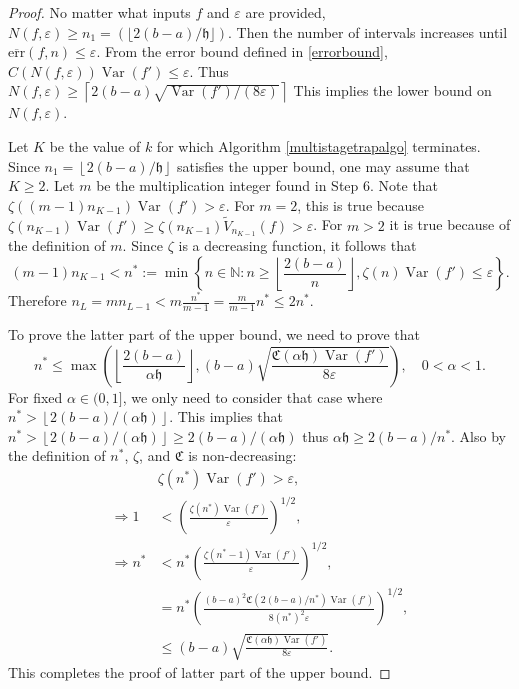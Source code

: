 \documentclass{iitthesis}
\DeclareMathOperator{\Var}{Var}
\theoremstyle{definition}
\theoremstyle{remark}
\begin{document}
\begin{proof}
  No matter what inputs $f$ and $\varepsilon$ are provided, $N(f,\varepsilon)\ge n_1=(\lfloor 2(b-a)/\mathfrak{h}\rfloor)$. Then the number of intervals increases until $\overline{\text{err}}(f,n)\le\varepsilon$. From the error bound defined in \eqref{errorbound}, $C(N(f,\varepsilon))\Var(f')\leq \varepsilon$. Thus $N(f,\varepsilon)\geq \left\lceil2(b-a)\sqrt{\Var(f')/(8\varepsilon)}\right\rceil$ This implies the lower bound on $N(f,\varepsilon)$.

  Let $K$ be the value of $k$ for which Algorithm \ref{multistagetrapalgo} terminates. Since $n_1=\left\lfloor2(b-a)/\mathfrak{h}\right\rfloor$ satisfies the upper bound, one may assume that $K \ge 2$. Let $m$ be the multiplication integer found in Step 6. Note that $\zeta((m-1)n_{K-1})\Var(f')>\varepsilon$. For $m=2$, this is true because $\zeta(n_{K-1})\Var(f')\ge\zeta(n_{K-1})\widetilde{V}_{n_{K-1}}(f)>\varepsilon$. For $m>2$ it is true because of the definition of $m$. Since $\zeta$ is a decreasing function, it follows that
  $$(m-1)n_{K-1}<n^*:=\min\left\{n\in\mathbb{N}:n\ge\left\lfloor\frac{2(b-a)}{n}\right\rfloor,\zeta(n)\Var(f')\le\varepsilon\right\}.$$
  Therefore $n_L=mn_{L-1}<m\frac{n^*}{m-1}=\frac{m}{m-1}n^*\le2n^*$.

  To prove the latter part of the upper bound, we need to prove that
  $$n^*\leq\max\left(\left\lfloor\frac{2(b-a)}{\alpha\mathfrak{h}}\right\rfloor,(b-a)\sqrt{\frac{\mathfrak{C}(\alpha\mathfrak{h})\Var(f')}{8\varepsilon}}\right),\quad 0<\alpha<1.$$
  For fixed $\alpha\in(0,1]$, we only need to consider that case where $n^*>\left\lfloor2(b-a)/(\alpha\mathfrak{h})\right\rfloor$. This implies that $n^*>\left\lfloor2(b-a)/(\alpha\mathfrak{h})\right\rfloor\ge 2(b-a)/(\alpha\mathfrak{h})$ thus $\alpha\mathfrak{h}\ge2(b-a)/n^*$. Also by the definition of $n^*$, $\zeta$, and $\mathfrak{C}$ is non-decreasing:
  \begin{align*}
    &\zeta(n^*)\Var(f')>\varepsilon, \\
    \Rightarrow 1&<\left(\frac{\zeta(n^*)\Var(f')}{\varepsilon}\right)^{1/2},\\
    \Rightarrow n^*&<n^*\left(\frac{\zeta(n^*-1)\Var(f')}{\varepsilon}\right)^{1/2},\\
    &=n^*\left(\frac{(b-a)^2\mathfrak{C}(2(b-a)/n^*)\Var(f')}{8(n^*)^2\varepsilon}\right)^{1/2},\\
    &\le(b-a)\sqrt{\frac{\mathfrak{C}(\alpha\mathfrak{h})\Var(f')}{8\varepsilon}}.
  \end{align*}
  This completes the proof of latter part of the upper bound.
\end{proof}
\end{document}
